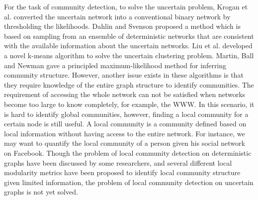 \documentclass[\main/thesis.tex]{subfiles}
\begin{document}
For the task of community detection, to solve the uncertain problem, Krogan et al. \cite{krogan2006global} converted the uncertain network into a conventional binary network by thresholding the likelihoods. Dahlin and Svenson \cite{dahlin2011method} proposed a method which is based on sampling from an ensemble of deterministic networks that are consistent with the available information about the uncertain networks. Liu et al. \cite{liureliable} developed a novel k-means algorithm to solve the uncertain clustering problem.  Martin, Ball and Newman \cite{martin2016structural} gave a principled maximum-likelihood method for inferring community structure. However, another issue exists in these algorithms is that they require knowledge of the entire graph structure to identify communities. The requirement of accessing the whole network can not be satisfied when networks become too large to know completely, for example, the WWW. In this scenario, it is hard to identify global communities, however, finding a local community for a certain node is still useful. A local community is a community defined based on local information without having access to the entire network. For instance, we may want to quantify the local community of a person given his social network on Facebook. Though the problem of local community detection on deterministic graphs have been discussed by some researchers, and several different local modularity metrics \cite{clauset2005finding,chen2009detecting,chen2009local} have been proposed to identify local community structure given limited information, the problem of local community detection on uncertain graphs is not yet solved.
\end{document}
